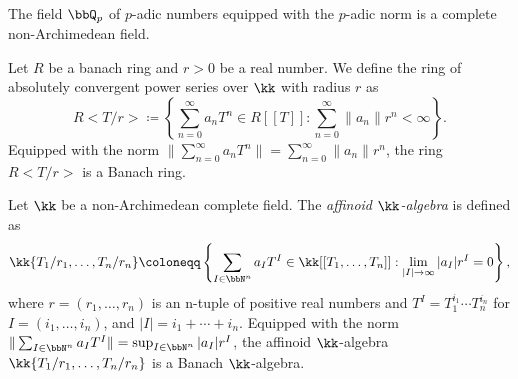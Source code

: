     \begin{example}\label{eg:p-adic_fields_as_complete_fields}
        The field \(\bbQ_p\) of \(p\)-adic numbers equipped with the \(p\)-adic norm is a complete non-Archimedean field.
    \end{example}

    \begin{example}\label{eg:ring_of_absolutely_convergent_power_series_as_banach_rings}
        Let \(R\) be a banach ring and \(r > 0\) be a real number.
        We define the ring of absolutely convergent power series over \(\kk\) with radius \(r\) as
        \[ R<T/r> \coloneqq \left\{\sum_{n=0}^{\infty} a_n T^n \in R[[T]] : \sum_{n=0}^{\infty} \|a_n\| r^n < \infty \right\}. \]
        Equipped with the norm \(\|\sum_{n=0}^{\infty} a_n T^n\| = \sum_{n=0}^{\infty} \|a_n\| r^n\), the ring \(R<T/r>\) is a Banach ring.
    \end{example}

    \begin{example}\label{eg:affinoid_algebra_as_banach_rings}
        Let \(\kk\) be a non-Archimedean complete field.
        The \emph{affinoid \(\kk\)-algebra} is defined as 
        \[ \kk\{T_1/r_1, \ldots, T_n/r_n\} \coloneqq \left\{\sum_{I \in \bbN^n} a_I T^I \in \kk[[T_1, \ldots, T_n]] : \lim_{|I| \to \infty} |a_I| r^I = 0 \right\}, \]
        where \(r = (r_1, \ldots, r_n)\) is an n-tuple of positive real numbers and \(T^I = T_1^{i_1} \cdots T_n^{i_n}\) for \(I = (i_1, \ldots, i_n)\), and \(|I| = i_1 + \cdots + i_n\).
        Equipped with the norm \(\|\sum_{I \in \bbN^n} a_I T^I\| = \sup_{I \in \bbN^n} |a_I| r^I\), the affinoid \(\kk\)-algebra \(\kk\{T_1/r_1, \ldots, T_n/r_n\}\) is a Banach \(\kk\)-algebra.
    \end{example}
